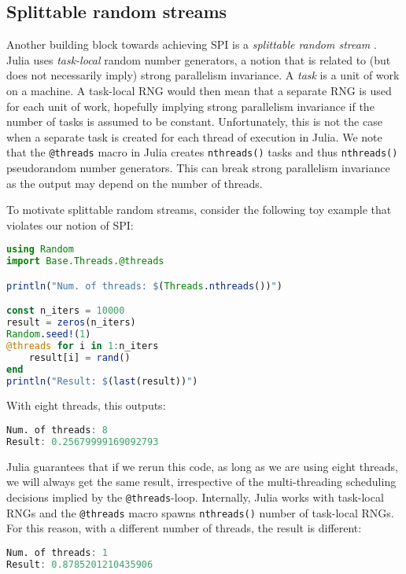 \subsection{Splittable random streams}
\label{sec:splittable_randoms}
Another building block towards achieving SPI is a \emph{splittable random stream}
\cite{lecuyer1988splittable,burton1992splittable}. 
Julia uses \emph{task-local} random number generators, a notion that is 
related to (but does not necessarily imply) strong parallelism invariance. 
A \emph{task} is a unit of work on a machine.
A task-local RNG would then mean that a separate RNG is 
used for each unit of work, hopefully implying strong parallelism invariance
if the number of tasks is assumed to be constant. 
Unfortunately, this is not the case when a separate task is created for each thread 
of execution in Julia.
We note that the \texttt{@threads} macro in Julia creates \texttt{nthreads()}
tasks and thus \texttt{nthreads()} pseudorandom number generators.
This can break strong parallelism invariance as the output may depend on the number of 
threads.

 
To motivate splittable random streams, consider the following toy example 
that violates our notion of SPI:
\begin{lstlisting}[language = Julia]
using Random
import Base.Threads.@threads

println("Num. of threads: $(Threads.nthreads())")

const n_iters = 10000
result = zeros(n_iters)
Random.seed!(1)
@threads for i in 1:n_iters
    result[i] = rand()
end
println("Result: $(last(result))")
\end{lstlisting}
With eight threads, this outputs:
\begin{lstlisting}[language = Julia]
Num. of threads: 8
Result: 0.25679999169092793
\end{lstlisting}
Julia guarantees that if we rerun this code, as long as we are using eight threads, 
we will always get the same result, irrespective of the multi-threading 
scheduling decisions implied by the \texttt{@threads}-loop. 
Internally, Julia works with task-local RNGs and the \texttt{@threads} macro 
spawns \texttt{nthreads()} number of task-local RNGs.
For this reason, with a different number of threads, the result is different:
\begin{minipage}{\linewidth}
\begin{lstlisting}[language = Julia]
Num. of threads: 1
Result: 0.8785201210435906
\end{lstlisting}
\end{minipage}

